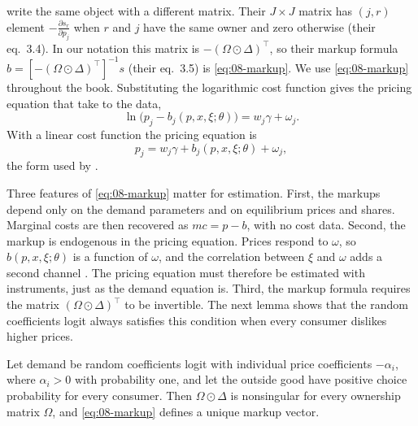 \citet{BerryLevinsohnPakes1995} write the same object with a different matrix. Their $J \times J$ matrix has
$(j, r)$ element $-\frac{\partial s_r}{\partial p_j}$ when $r$ and $j$ have the same owner and zero otherwise (their
eq.~3.4). In our notation this matrix is $-(\Omega \odot \Delta)^\top$, so their markup formula
$b = [-(\Omega\odot\Delta)^\top]^{-1}s$ (their eq.~3.5) is \eqref{eq:08-markup}. We use \eqref{eq:08-markup} throughout
the book. Substituting the logarithmic cost function gives the pricing equation that
\citet[eq.~3.6]{BerryLevinsohnPakes1995} take to the data,
\begin{equation}\label{eq:08-pricing-log}
  \ln\big(p_j - b_j(p, x, \xi; \theta)\big) = w_j\gamma + \omega_j .
\end{equation}
With a linear cost function the pricing equation is
\begin{equation}\label{eq:08-pricing-lin}
  p_j = w_j\gamma + b_j(p, x, \xi; \theta) + \omega_j ,
\end{equation}
the form used by \citet[eqs.~16--17]{BerryLevinsohnPakes2004}.

Three features of \eqref{eq:08-markup} matter for estimation. First, the markups depend only on the demand parameters
and on equilibrium prices and shares. Marginal costs are then recovered as $mc = p - b$, with no cost data. Second, the
markup is endogenous in the pricing equation. Prices respond to $\omega$, so $b(p, x, \xi; \theta)$ is a function of
$\omega$, and the correlation between $\xi$ and $\omega$ adds a second channel
\citep[p.~854]{BerryLevinsohnPakes1995}. The pricing equation must therefore be estimated with instruments, just as
the demand equation is. Third, the markup formula requires the matrix $(\Omega \odot \Delta)^\top$ to be invertible.
The next lemma shows that the random coefficients logit always satisfies this condition when every consumer dislikes
higher prices.

\begin{lemma}\label{lem:08-markup}
Let demand be random coefficients logit with individual price coefficients $-\alpha_i$, where $\alpha_i > 0$ with
probability one, and let the outside good have positive choice probability for every consumer. Then
$\Omega \odot \Delta$ is nonsingular for every ownership matrix $\Omega$, and \eqref{eq:08-markup} defines a unique
markup vector.
\end{lemma}

